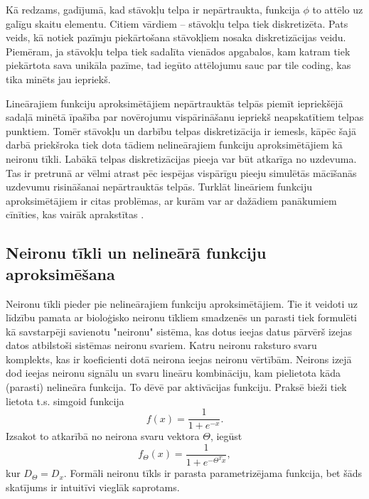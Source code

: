 \documentclass{ludis} %
\begin{document}
Kā redzams, gadījumā, kad stāvokļu telpa ir nepārtraukta, funkcija $\phi$ to attēlo uz galīgu skaitu elementu.
Citiem vārdiem -- stāvokļu telpa tiek diskretizēta.
Pats veids, kā notiek pazīmju piekārtošana stāvokļiem nosaka diskretizācijas veidu.
Piemēram, ja stāvokļu telpa tiek sadalīta vienādos apgabalos, kam katram tiek piekārtota sava unikāla pazīme, tad iegūto attēlojumu sauc par tile coding, kas tika minēts jau iepriekš.

Lineārajiem funkciju aproksimētājiem nepārtrauktās telpās piemīt iepriekšējā sadaļā minētā īpašība par novērojumu vispārināšanu iepriekš neapskatītiem telpas punktiem.
Tomēr stāvokļu un darbību telpas diskretizācija ir iemesls, kāpēc šajā darbā priekšroka tiek dota tādiem nelineārajiem funkciju aproksimētājiem kā neironu tīkli.
Labākā telpas diskretizācijas pieeja var būt atkarīga no uzdevuma.
Tas ir pretrunā ar vēlmi atrast pēc iespējas vispārīgu pieeju simulētās mācīšanās uzdevumu risināšanai nepārtrauktās telpās.
Turklāt lineāriem funkciju aproksimētājiem ir citas problēmas, ar kurām var ar dažādiem panākumiem cīnīties, kas vairāk aprakstītas \autocite{Hasselt2012} .

\subsection{Neironu tīkli un nelineārā funkciju aproksimēšana}
Neironu tīkli pieder pie nelineārajiem funkciju aproksimētājiem.
Tie it veidoti uz līdzību pamata ar bioloģisko neironu tīkliem smadzenēs un parasti tiek formulēti kā savstarpēji savienotu "neironu" sistēma, kas dotus ieejas datus pārvērš izejas datos atbilstoši sistēmas neironu svariem.
Katru neironu raksturo svaru komplekts, kas ir koeficienti dotā neirona ieejas neironu vērtībām.
Neirons izejā dod ieejas neironu signālu un svaru lineāru kombināciju, kam pielietota kāda (parasti) nelineāra funkcija. To dēvē par aktivācijas funkciju.
Praksē bieži tiek lietota t.s. simgoid funkcija
\[
	f(x) = \frac{1}{1 + e^{-x}}.
\]
Izsakot to atkarībā no neirona svaru vektora $\Theta$, iegūst
\[
	f_\Theta(x) = \frac{1}{1 + e^{-\Theta^T x}},
\]
kur $D_\Theta = D_x$. Formāli neironu tīkls ir parasta parametrizējama funkcija, bet šāds skatījums ir intuitīvi vieglāk saprotams.
\end{document}
